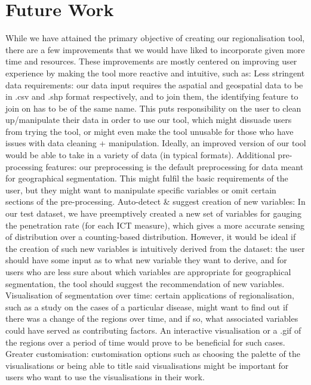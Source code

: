 \documentclass{acm_proc_article-sp}
\begin{document}
\hypertarget{future-work}{%
\section{Future Work}\label{future-work}}

While we have attained the primary objective of creating our
regionalisation tool, there are a few improvements that we would have
liked to incorporate given more time and resources. These improvements
are mostly centered on improving user experience by making the tool more
reactive and intuitive, such as: Less stringent data requirements: our
data input requires the aspatial and geospatial data to be in .csv and
.shp format respectively, and to join them, the identifying feature to
join on has to be of the same name. This puts responsibility on the user
to clean up/manipulate their data in order to use our tool, which might
dissuade users from trying the tool, or might even make the tool
unusable for those who have issues with data cleaning + manipulation.
Ideally, an improved version of our tool would be able to take in a
variety of data (in typical formats). Additional pre-processing
features: our preprocessing is the default preprocessing for data meant
for geographical segmentation. This might fulfil the basic requirements
of the user, but they might want to manipulate specific variables or
omit certain sections of the pre-processing. Auto-detect \& suggest
creation of new variables: In our test dataset, we have preemptively
created a new set of variables for gauging the penetration rate (for
each ICT measure), which gives a more accurate sensing of distribution
over a counting-based distribution. However, it would be ideal if the
creation of such new variables is intuitively derived from the dataset:
the user should have some input as to what new variable they want to
derive, and for users who are less sure about which variables are
appropriate for geographical segmentation, the tool should suggest the
recommendation of new variables. Visualisation of segmentation over
time: certain applications of regionalisation, such as a study on the
cases of a particular disease, might want to find out if there was a
change of the regions over time, and if so, what associated variables
could have served as contributing factors. An interactive visualisation
or a .gif of the regions over a period of time would prove to be
beneficial for such cases. Greater customisation: customisation options
such as choosing the palette of the visualisations or being able to
title said visualisations might be important for users who want to use
the visualisations in their work.
\setlength{\parindent}{0in}
\end{document}
